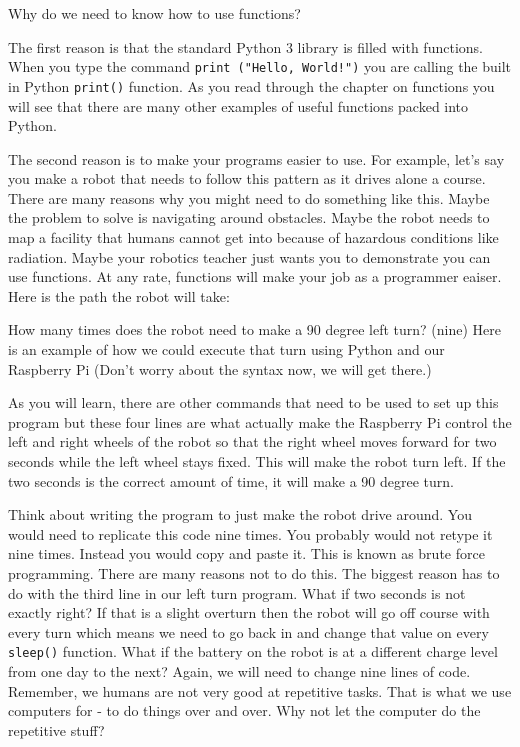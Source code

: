 \documentclass[
]{book}
\begin{document}
Why do we need to know how to use functions?

The first reason is that the standard Python 3 library is filled with functions. When you type the command \texttt{print\ ("Hello,\ World!")} you are calling the built in Python \texttt{print()} function. As you read through the chapter on functions you will see that there are many other examples of useful functions packed into Python.

The second reason is to make your programs easier to use. For example, let's say you make a robot that needs to follow this pattern as it drives alone a course. There are many reasons why you might need to do something like this. Maybe the problem to solve is navigating around obstacles. Maybe the robot needs to map a facility that humans cannot get into because of hazardous conditions like radiation. Maybe your robotics teacher just wants you to demonstrate you can use functions. At any rate, functions will make your job as a programmer eaiser. Here is the path the robot will take:

How many times does the robot need to make a 90 degree left turn? (nine) Here is an example of how we could execute that turn using Python and our Raspberry Pi (Don't worry about the syntax now, we will get there.)

As you will learn, there are other commands that need to be used to set up this program but these four lines are what actually make the Raspberry Pi control the left and right wheels of the robot so that the right wheel moves forward for two seconds while the left wheel stays fixed. This will make the robot turn left. If the two seconds is the correct amount of time, it will make a 90 degree turn.

Think about writing the program to just make the robot drive around. You would need to replicate this code nine times. You probably would not retype it nine times. Instead you would copy and paste it. This is known as brute force programming. There are many reasons not to do this. The biggest reason has to do with the third line in our left turn program. What if two seconds is not exactly right? If that is a slight overturn then the robot will go off course with every turn which means we need to go back in and change that value on every \texttt{sleep()} function. What if the battery on the robot is at a different charge level from one day to the next? Again, we will need to change nine lines of code. Remember, we humans are not very good at repetitive tasks. That is what we use computers for - to do things over and over. Why not let the computer do the repetitive stuff?
\end{document}
